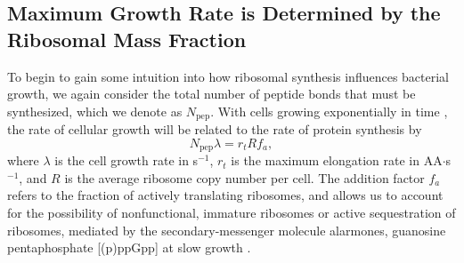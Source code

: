 \subsection{Maximum Growth Rate is Determined by the Ribosomal Mass Fraction}
To begin to gain some intuition into how ribosomal synthesis influences
bacterial growth, we again consider the total number of peptide bonds that must
be synthesized, which we denote as $N_\text{pep}$. With cells growing exponentially in time
\citep{godin2010}, the rate of cellular growth will be related to the rate of protein synthesis by
\begin{equation}
    N_\text{pep} \lambda = r_t R f_a,
    \label{eq:mass_balance}
\end{equation}
where $\lambda$ is the cell growth rate in s$^{-1}$, $r_t$ is the maximum
elongation rate in AA$\cdot$s$^{-1}$, and $R$ is the average ribosome copy
number per cell. The addition factor $f_a$ refers to the fraction of actively
translating ribosomes, and allows us to account for the possibility of
nonfunctional, immature ribosomes or active sequestration of ribosomes, mediated
by the secondary-messenger molecule alarmones, guanosine pentaphosphate
[(p)ppGpp] at slow growth \citep{dennis2004, dai2016}.

